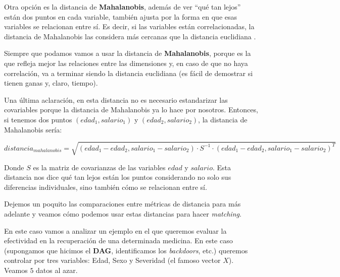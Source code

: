 \documentclass[
  letterpaper,
  DIV=11,
  numbers=noendperiod,
  oneside]{scrreprt}
\begin{document}
Otra opción es la distancia de \textbf{Mahalanobis}, además de ver ``qué
tan lejos'' están dos puntos en cada variable, también ajusta por la
forma en que esas variables se relacionan entre sí. Es decir, si las
variables están correlacionadas, la distancia de Mahalanobis las
considera más cercanas que la distancia euclidiana .

Siempre que podamos vamos a usar la distancia de \textbf{Mahalanobis},
porque es la que refleja mejor las relaciones entre las dimensiones y,
en caso de que no haya correlación, va a terminar siendo la distancia
euclidiana (es fácil de demostrar si tienen ganas y, claro, tiempo).

Una última aclaración, en esta distancia no es necesario estandarizar
las covariables porque la distancia de Mahalanobis ya lo hace por
nosotros. Entonces, si tenemos dos puntos \((edad_1, salario_1)\) y
\((edad_2, salario_2)\), la distancia de Mahalanobis sería:

\[
distancia_{mahalanobis} = \sqrt{(edad_1 - edad_2, salario_1 - salario_2) \cdot S^{-1} \cdot (edad_1 - edad_2, salario_1 - salario_2)^T}
\]

Donde \(S\) es la matriz de covarianzas de las variables \(edad\) y
\(salario\). Esta distancia nos dice qué tan lejos están los puntos
considerando no solo sus diferencias individuales, sino también cómo se
relacionan entre sí.

Dejemos un poquito las comparaciones entre métricas de distancia para
más adelante y veamos cómo podemos usar estas distancias para hacer
\emph{matching}.

En este caso vamos a analizar un ejemplo en el que queremos evaluar la
efectividad en la recuperación de una determinada medicina. En este caso
(supongamos que hicimos el \textbf{DAG}, identificamos los
\emph{backdoors}, etc.) queremos controlar por tres variables: Edad,
Sexo y Severidad (el famoso vector \(X\)). Veamos \(5\) datos al azar.
\end{document}
